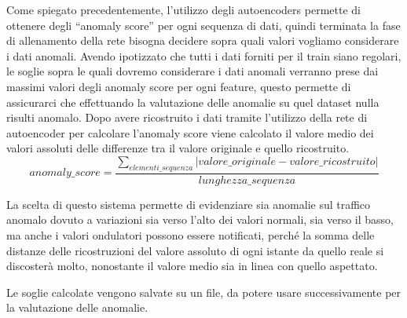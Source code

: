 Come spiegato precedentemente, l'utilizzo degli autoencoders permette di ottenere degli ``anomaly score'' per ogni sequenza di dati, quindi terminata la fase di allenamento della rete bisogna decidere sopra quali valori vogliamo considerare i dati anomali.
Avendo ipotizzato che tutti i dati forniti per il train siano regolari, le soglie sopra le quali dovremo considerare i dati anomali verranno prese dai massimi valori degli anomaly score per ogni feature, questo permette di assicurarci che effettuando la valutazione delle anomalie su quel dataset nulla risulti anomalo.
Dopo avere ricostruito i dati tramite l’utilizzo della rete di autoencoder per calcolare l'anomaly score viene calcolato il valore medio dei valori assoluti delle differenze tra il valore originale e quello ricostruito.
\begin{equation}
    anomaly\_score = \frac{\sum_{elementi\_sequenza}\lvert valore\_originale - valore\_ricostruito \rvert}{lunghezza\_sequenza}
\end{equation}

La scelta di questo sistema permette di evidenziare sia anomalie sul traffico anomalo dovuto a variazioni sia verso l'alto dei valori normali, sia verso il basso, ma anche i valori ondulatori possono essere notificati, perché la somma delle distanze delle ricostruzioni del valore assoluto di ogni istante da quello reale si discosterà molto, nonostante il valore medio sia in linea con quello aspettato.

Le soglie calcolate vengono salvate su un file, da potere usare successivamente per la valutazione delle anomalie.









